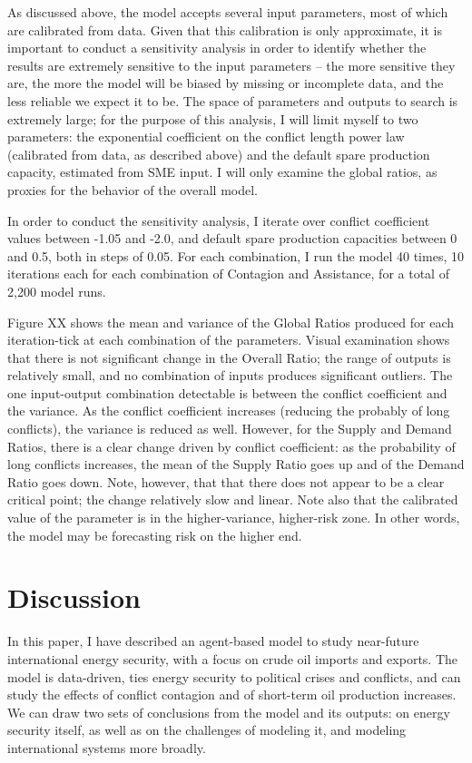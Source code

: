\documentclass{article}
\begin{document}
As discussed above, the model accepts several input parameters, most of which are calibrated from data. Given that this calibration is only approximate, it is important to conduct a sensitivity analysis in order to identify whether the results are extremely sensitive to the input parameters -- the more sensitive they are, the more the model will be biased by missing or incomplete data, and the less reliable we expect it to be. The space of parameters and outputs to search is extremely large; for the purpose of this analysis, I will limit myself to two parameters: the exponential coefficient on the conflict length power law (calibrated from data, as described above) and the default spare production capacity, estimated from SME input. I will only examine the global ratios, as proxies for the behavior of the overall model.

In order to conduct the sensitivity analysis, I iterate over conflict coefficient values between -1.05 and -2.0, and default spare production capacities between 0 and 0.5, both in steps of 0.05. For each combination, I run the model 40 times, 10 iterations each for each combination of Contagion and Assistance, for a total of 2,200 model runs. 

Figure XX shows the mean and variance of the Global Ratios produced for each iteration-tick at each combination of the parameters. Visual examination shows that there is not significant change in the Overall Ratio; the range of outputs is relatively small, and no combination of inputs produces significant outliers. The one input-output combination detectable is between the conflict coefficient and the variance. As the conflict coefficient increases (reducing the probably of long conflicts), the variance is reduced as well. However, for the Supply and Demand Ratios, there is a clear change driven by conflict coefficient: as the probability of long conflicts increases, the mean of the Supply Ratio goes up and of the Demand Ratio goes down. Note, however, that that there does not appear to be a clear critical point; the change relatively slow and linear. Note also that the calibrated value of the parameter is in the higher-variance, higher-risk zone. In other words, the model may be forecasting risk on the higher end. 



\section{Discussion}

In this paper, I have described an agent-based model to study near-future international energy security, with a focus on crude oil imports and exports. The model is data-driven, ties energy security to political crises and conflicts, and can study the effects of conflict contagion and of short-term oil production increases. We can draw two sets of conclusions from the model and its outputs: on energy security itself, as well as on the challenges of modeling it, and modeling international systems more broadly.
\end{document}
